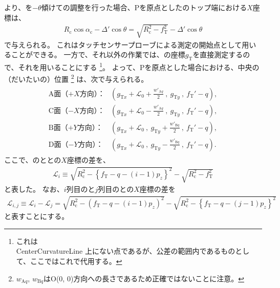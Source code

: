 \clearpage
より、\Table を$-\theta$傾けて\AlocationLength の調整を行った場合、\TableCenter Pを原点とした\CenterCurvatureLine のトップ端における$X$座標は、
\begin{align*}
  R_\mathrm c\cos\alpha_\mathrm c-\Delta'\cos\theta = \sqrt{R_\mathrm c^2-f_\mathrm T^2}-\Delta'\cos\theta
\end{align*}
で与えられる。
これはタッチセンサープローブによる測定の開始点として用いることができる。
一方で、それ以外の作業では、\TopIDCenter の座標$g_\mathrm T$を直接測定するので、それを用いることにする
\footnote{これは\\CenterCurvatureLine 上にない点であるが、公差の範囲内であるものとして、ここではこれで代用する。}。
よって、\TableCenter Pを原点とした場合における、\DimpleFirstRow 中央の（だいたいの）位置
\footnote{$w_{\mathrm Aq}$, $w_{\mathrm Bq}$は\CurvatureCenter{}O(0, 0)方向への長さであるため正確ではないことに注意。}\relax
は、次で与えられる。
\begin{align*}
\begin{array}{rl}
  \text{A面（$+X$方向）：}
  & \displaystyle
    \left(
      g_{\mathrm Tx}+\mathcal L_0+\frac{w'_{\mathrm Aq}}2~,~
      g_{\mathrm Ty}~,~
      f_\mathrm T'-q
    \right),\\[12pt]
  \text{C面（$-X$方向）：}
  & \displaystyle
    \left(
      g_{\mathrm Tx}+\mathcal L_0-\frac{w'_{\mathrm Aq}}2~,~
      g_{\mathrm Ty}~,~
      f_\mathrm T'-q
    \right),\\[12pt]
  \text{B面（$+Y$方向）：}
  & \displaystyle
    \left(
      g_{\mathrm Tx}+\mathcal L_0~,~
      g_{\mathrm Ty}+\frac{w'_{\mathrm Bq}}2~,~
      f_\mathrm T'-q
    \right),\\[12pt]
  \text{D面（$-Y$方向）：}
  & \displaystyle
    \left(
      g_{\mathrm Tx}+\mathcal L_0~,~
      g_{\mathrm Ty}-\frac{w'_{\mathrm Bq}}2~,~
      f_\mathrm T'-q
    \right).
\end{array}
\end{align*}
ここで、\DimpleIRow の\CurvatureCenter と\TopCurvatureCenter との$X$座標の差を、
\begin{align}
  \label{eq:dimpleCenterDistance}
  \mathcal L_i
  \equiv \sqrt{R_\mathrm c^2-\left\{f_\mathrm T-q-(i-1)p_z\right\}^2}-\sqrt{R_\mathrm c^2-f_\mathrm T^2}
\end{align}
と表した。
なお、$i$列目の\CurvatureCenter と$j$列目の\CurvatureCenter との$X$座標の差を
\begin{align*}
  \mathcal L_{i,j}
  \equiv \mathcal L_i-\mathcal L_j
  = \sqrt{R_\mathrm c^2-\left(f_\mathrm T-q-(i-1)p_z\right)^2}
    -\sqrt{R_\mathrm c^2-\left\{f_\mathrm T-q-(j-1)p_z\right\}^2}
\end{align*}
と表すことにする。


